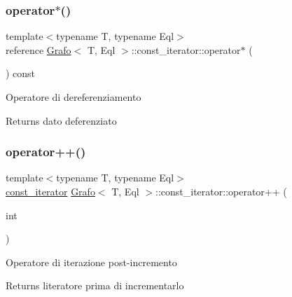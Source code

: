 \subsubsection{\texorpdfstring{operator$\ast$()}{operator*()}}
{\footnotesize\ttfamily template$<$typename T, typename Eql$>$ \\
reference \hyperlink{classGrafo}{Grafo}$<$ T, Eql $>$\+::const\+\_\+iterator\+::operator$\ast$ (\begin{DoxyParamCaption}{ }\end{DoxyParamCaption}) const\hspace{0.3cm}{\ttfamily [inline]}}

Operatore di dereferenziamento \begin{DoxyReturn}{Returns}
dato deferenziato 
\end{DoxyReturn}
\mbox{\label{classGrafo_1_1const__iterator_a6830f02c3e63342d3a3023410fa45ffa}} 
\subsubsection{\texorpdfstring{operator++()}{operator++()}\hspace{0.1cm}{\footnotesize\ttfamily [1/2]}}
{\footnotesize\ttfamily template$<$typename T, typename Eql$>$ \\
\hyperlink{classGrafo_1_1const__iterator}{const\+\_\+iterator} \hyperlink{classGrafo}{Grafo}$<$ T, Eql $>$\+::const\+\_\+iterator\+::operator++ (\begin{DoxyParamCaption}\item[{int}]{ }\end{DoxyParamCaption})\hspace{0.3cm}{\ttfamily [inline]}}

Operatore di iterazione post-\/incremento \begin{DoxyReturn}{Returns}
l\textquotesingle{}iteratore prima di incrementarlo 
\end{DoxyReturn}
\mbox{\label{classGrafo_1_1const__iterator_a57e23174372e4703e134ce2b35a0567b}} 
